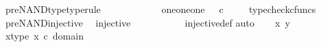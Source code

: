 \begin{isabellebody}
\isanewline
{}\isamarkupfalse%
\ pre{\isacharunderscore}{\kern0pt}NAND{\isacharunderscore}{\kern0pt}type{\isacharbrackleft}{\kern0pt}type{\isacharunderscore}{\kern0pt}rule{\isacharbrackright}{\kern0pt}{\isacharcolon}{\kern0pt}\ \isanewline
\ \ {\isachardoublequoteopen}{\isasymlangle}{\isasymf}{\isacharcomma}{\kern0pt}\ {\isasymf}{\isasymrangle}\ {\isasymamalg}\ {\isacharparenleft}{\kern0pt}{\isasymlangle}{\isasymt}{\isacharcomma}{\kern0pt}\ {\isasymf}{\isasymrangle}\ {\isasymamalg}\ {\isasymlangle}{\isasymf}{\isacharcomma}{\kern0pt}\ {\isasymt}{\isasymrangle}{\isacharparenright}{\kern0pt}\ {\isacharcolon}{\kern0pt}\ one{\isasymCoprod}{\isacharparenleft}{\kern0pt}one{\isasymCoprod}one{\isacharparenright}{\kern0pt}\ {\isasymrightarrow}\ {\isasymOmega}\ {\isasymtimes}\isactrlsub c\ {\isasymOmega}{\isachardoublequoteclose}\isanewline
%
\isadelimproof
\ \ %
\endisadelimproof
%
\isatagproof
{}\isamarkupfalse%
\ typecheck{\isacharunderscore}{\kern0pt}cfuncs%
\endisatagproof
{\isafoldproof}%
%
\isadelimproof
\isanewline
%
\endisadelimproof
\isanewline
{}\isamarkupfalse%
\ pre{\isacharunderscore}{\kern0pt}NAND{\isacharunderscore}{\kern0pt}injective{\isacharcolon}{\kern0pt}\isanewline
\ \ {\isachardoublequoteopen}injective{\isacharparenleft}{\kern0pt}{\isasymlangle}{\isasymf}{\isacharcomma}{\kern0pt}\ {\isasymf}{\isasymrangle}\ {\isasymamalg}\ {\isacharparenleft}{\kern0pt}{\isasymlangle}{\isasymt}{\isacharcomma}{\kern0pt}\ {\isasymf}{\isasymrangle}\ {\isasymamalg}\ {\isasymlangle}{\isasymf}{\isacharcomma}{\kern0pt}\ {\isasymt}{\isasymrangle}{\isacharparenright}{\kern0pt}{\isacharparenright}{\kern0pt}{\isachardoublequoteclose}\isanewline
%
\isadelimproof
\ \ %
\endisadelimproof
%
\isatagproof
{}\isamarkupfalse%
\ injective{\isacharunderscore}{\kern0pt}def\isanewline
{}\isamarkupfalse%
{\isacharparenleft}{\kern0pt}auto{\isacharparenright}{\kern0pt}\isanewline
\ \ \isamarkupfalse%
\ x\ y\ \isanewline
\ \ \isamarkupfalse%
\ x{\isacharunderscore}{\kern0pt}type{\isacharcolon}{\kern0pt}\ {\isachardoublequoteopen}x\ {\isasymin}\isactrlsub c\ domain\ {\isacharparenleft}{\kern0pt}{\isasymlangle}{\isasymf}{\isacharcomma}{\kern0pt}\ {\isasymf}{\isasymrangle}\ {\isasymamalg}\ {\isasymlangle}{\isasymt}{\isacharcomma}{\kern0pt}{\isasymf}{\isasymrangle}\ {\isasymamalg}\ {\isasymlangle}{\isasymf}{\isacharcomma}{\kern0pt}{\isasymt}{\isasymrangle}{\isacharparenright}{\kern0pt}{\isachardoublequoteclose}\ \isanewline
\ \ \isamarkupfalse%
\ \isamarkupfalse%

\end{isabellebody}
